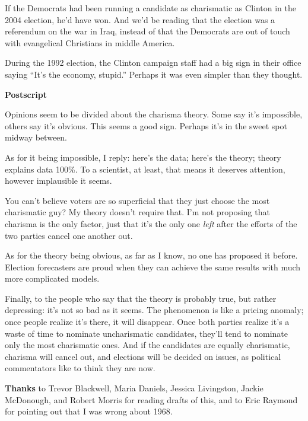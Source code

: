 If the Democrats had been running a candidate as charismatic as Clinton
in the 2004 election, he'd have won. And we'd be reading that the
election was a referendum on the war in Iraq, instead of that the
Democrats are out of touch with evangelical Christians in middle
America.

During the 1992 election, the Clinton campaign staff had a big sign in
their office saying ``It's the economy, stupid.'' Perhaps it was even
simpler than they thought.

\textbf{Postscript}

Opinions seem to be divided about the charisma theory. Some say it's
impossible, others say it's obvious. This seems a good sign. Perhaps
it's in the sweet spot midway between.

As for it being impossible, I reply: here's the data; here's the theory;
theory explains data 100\%. To a scientist, at least, that means it
deserves attention, however implausible it seems.

You can't believe voters are so superficial that they just choose the
most charismatic guy? My theory doesn't require that. I'm not proposing
that charisma is the only factor, just that it's the only one
\emph{left} after the efforts of the two parties cancel one another out.

As for the theory being obvious, as far as I know, no one has proposed
it before. Election forecasters are proud when they can achieve the same
results with much more complicated models.

Finally, to the people who say that the theory is probably true, but
rather depressing: it's not so bad as it seems. The phenomenon is like a
pricing anomaly; once people realize it's there, it will disappear. Once
both parties realize it's a waste of time to nominate uncharismatic
candidates, they'll tend to nominate only the most charismatic ones. And
if the candidates are equally charismatic, charisma will cancel out, and
elections will be decided on issues, as political commentators like to
think they are now.


\textbf{Thanks} to Trevor Blackwell, Maria Daniels, Jessica Livingston,
Jackie McDonough, and Robert Morris for reading drafts of this, and to
Eric Raymond for pointing out that I was wrong about 1968.